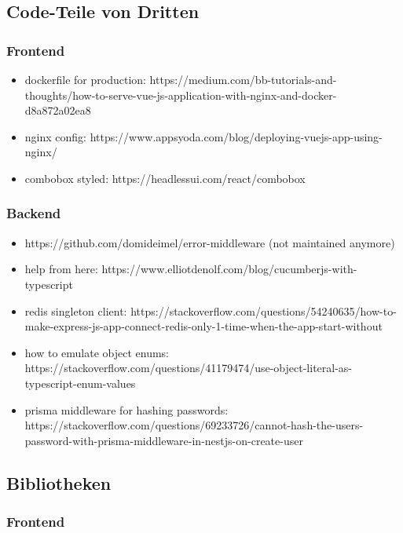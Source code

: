 \documentclass[a4paper, 12pt]{article}
\begin{document}
    \subsection{Code-Teile von Dritten}
    \subsubsection{Frontend}
\begin{itemize}
  \item dockerfile for production: https://medium.com/bb-tutorials-and-thoughts/how-to-serve-vue-js-application-with-nginx-and-docker-d8a872a02ea8
  \item nginx config: https://www.appsyoda.com/blog/deploying-vuejs-app-using-nginx/
  \item combobox styled: https://headlessui.com/react/combobox
\end{itemize}

    \subsubsection{Backend}

\begin{itemize}
  \item https://github.com/domideimel/error-middleware  (not maintained anymore)
  \item help from here: https://www.elliotdenolf.com/blog/cucumberjs-with-typescript
  \item redis singleton client: https://stackoverflow.com/questions/54240635/how-to-make-express-js-app-connect-redis-only-1-time-when-the-app-start-without
  \item how to emulate object enums: https://stackoverflow.com/questions/41179474/use-object-literal-as-typescript-enum-values
  \item prisma middleware for hashing passwords: https://stackoverflow.com/questions/69233726/cannot-hash-the-users-password-with-prisma-middleware-in-nestjs-on-create-user
\end{itemize}

    \newpage
    \subsection{Bibliotheken}
    \subsubsection{Frontend}
\end{document}
